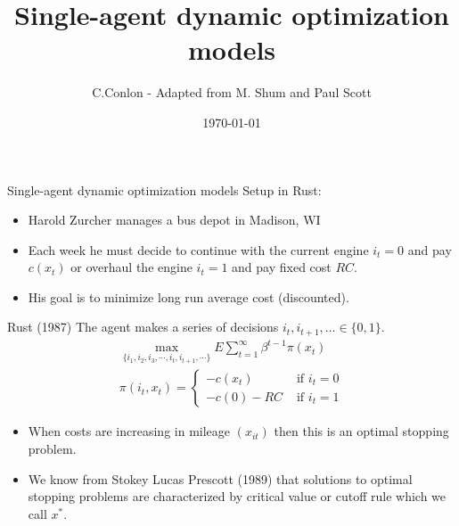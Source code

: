 \documentclass[xcolor=pdftex,dvipsnames,table,mathserif]{beamer}
\title [Single-agent dynamic optimization models]{Single-agent dynamic optimization models}
\author{C.Conlon - Adapted from M. Shum and Paul Scott}
\institute{Grad IO }
\date{\today}
\begin{document}
\begin{frame}
\titlepage
\end{frame}

\begin{frame}{Single-agent dynamic optimization models}
Setup in Rust:
\begin{itemize}
\item Harold Zurcher manages a bus depot in Madison, WI
\item Each week he must decide to continue with the current engine $i_t=0$ and pay $c(x_{t})$ or overhaul the engine $i_t=1$ and pay fixed cost $RC$.
\item His goal is to minimize \alert{long run average cost} (discounted).
\end{itemize}
\end{frame}




\begin{frame}{Rust (1987)}
The agent makes a series of decisions $i_t,i_{t+1},\ldots \in \{0,1\}$.
\begin{eqnarray*}
\max_{\{i_1, i_2, i_3, \cdots, i_t, i_{t+1}, \cdots \}} E \sum^{\infty}_{t=1} \beta^{t-1} \pi (x_t)\\
\pi \left(i_{t},x_{t} \right)=
		\begin{cases}
		-c\left(x_{t} \right)  & \mbox{ if }i_{t}=0\\		
		 -c\left(0\right) -RC& \mbox{ if }i_{t}=1
		\end{cases}
\end{eqnarray*}
\begin{itemize}
\item When costs are increasing in mileage $(x_{it})$ then this is an \alert{optimal stopping problem}.
\item We know from Stokey Lucas Prescott (1989) that solutions to optimal stopping problems are characterized by \alert{critical value} or \alert{cutoff rule} which we call $x^*$.
\end{itemize}
\end{frame}
\end{document}
